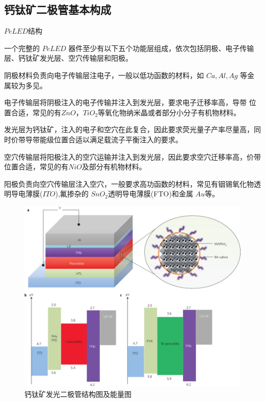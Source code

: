 \documentclass{beamer}[fontset=windows]
\begin{document}
\subsection{钙钛矿二极管基本构成}
\begin{frame}
	\begin{block}{$PeLED$结构}
		\begin{itemize}\small{
			\item 一个完整的 $PeLED$ 器件至少有以下五个功能层组成，依次包括阴极、电子传输层、钙钛矿发光层、空穴传输层和阳极。
			\item 阴极材料负责向电子传输层注电子，一般以低功函数的材料，如 $Ca, Al,Ag$ 等金属较为多见。
			\item 电子传输层将阴极注入的电子传输并注入到发光层，要求电子迁移率高，导带 位置合适，常见的有$ ZnO，TiO_{2} $等氧化物纳米晶或者部分小分子有机物材料。
			\item 发光层为钙钛矿，注入的电子和空穴在此复合，因此要求荧光量子产率尽量高，同时价带导带能级位置合适以满足载流子平衡注入的要求。
			\item 空穴传输层将阳极注入的空穴运输并注入到发光层，因此要求空穴迁移率高，价带位置合适，常见的有$ NiO$及部分有机物材料。
			\item 阳极负责向空穴传输层注入空穴，一般要求高功函数的材料，常见有铟锡氧化物透明导电薄膜($ITO$),氟掺杂的 $SnO_{2}$透明导电薄膜(FTO)和金属 $Au $等。}
		\end{itemize}
	\end{block}
\end{frame}
\begin{frame}
	\begin{figure}[H]
		\centering
		\hspace{2em}\includegraphics[width=.75\linewidth]{pic/6.jpg}
		\caption{钙钛矿发光二极管结构图及能量图
		}
	\end{figure}
\end{frame}
\end{document}
